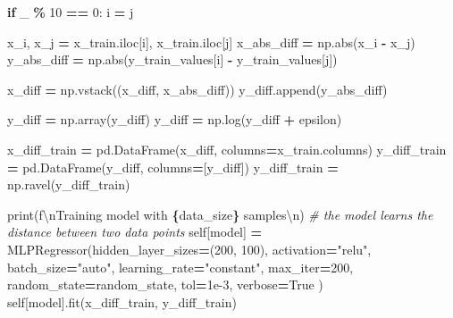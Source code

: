 \documentclass[
]{article}
\newenvironment{Shaded}{\begin{snugshade}}{\end{snugshade}}
\newcommand{\BuiltInTok}[1]{#1}
\newcommand{\CharTok}[1]{\textcolor[rgb]{0.31,0.60,0.02}{#1}}
\newcommand{\CommentTok}[1]{\textcolor[rgb]{0.56,0.35,0.01}{\textit{#1}}}
\newcommand{\ControlFlowTok}[1]{\textcolor[rgb]{0.13,0.29,0.53}{\textbf{#1}}}
\newcommand{\DecValTok}[1]{\textcolor[rgb]{0.00,0.00,0.81}{#1}}
\newcommand{\FloatTok}[1]{\textcolor[rgb]{0.00,0.00,0.81}{#1}}
\newcommand{\NormalTok}[1]{#1}
\newcommand{\OperatorTok}[1]{\textcolor[rgb]{0.81,0.36,0.00}{\textbf{#1}}}
\newcommand{\SpecialCharTok}[1]{\textcolor[rgb]{0.81,0.36,0.00}{\textbf{#1}}}
\newcommand{\SpecialStringTok}[1]{\textcolor[rgb]{0.31,0.60,0.02}{#1}}
\newcommand{\StringTok}[1]{\textcolor[rgb]{0.31,0.60,0.02}{#1}}
\newcommand{\VariableTok}[1]{\textcolor[rgb]{0.00,0.00,0.00}{#1}}
\begin{document}
\begin{Shaded}
\begin{Highlighting}[]
            \ControlFlowTok{if}\NormalTok{ \_ }\OperatorTok{\%} \DecValTok{10} \OperatorTok{==} \DecValTok{0}\NormalTok{:}
\NormalTok{                i }\OperatorTok{=}\NormalTok{ j}

\NormalTok{            x\_i, x\_j }\OperatorTok{=}\NormalTok{ x\_train.iloc[i], x\_train.iloc[j]}
\NormalTok{            x\_abs\_diff }\OperatorTok{=}\NormalTok{ np.}\BuiltInTok{abs}\NormalTok{(x\_i }\OperatorTok{{-}}\NormalTok{ x\_j)}
\NormalTok{            y\_abs\_diff }\OperatorTok{=}\NormalTok{ np.}\BuiltInTok{abs}\NormalTok{(y\_train\_values[i] }\OperatorTok{{-}}\NormalTok{ y\_train\_values[j])}

\NormalTok{            x\_diff }\OperatorTok{=}\NormalTok{ np.vstack((x\_diff, x\_abs\_diff))}
\NormalTok{            y\_diff.append(y\_abs\_diff)}

\NormalTok{        y\_diff }\OperatorTok{=}\NormalTok{ np.array(y\_diff)}
\NormalTok{        y\_diff }\OperatorTok{=}\NormalTok{ np.log(y\_diff }\OperatorTok{+}\NormalTok{ epsilon)}

\NormalTok{        x\_diff\_train }\OperatorTok{=}\NormalTok{ pd.DataFrame(x\_diff, columns}\OperatorTok{=}\NormalTok{x\_train.columns)}
\NormalTok{        y\_diff\_train }\OperatorTok{=}\NormalTok{ pd.DataFrame(y\_diff, columns}\OperatorTok{=}\NormalTok{[}\StringTok{\textquotesingle{}y\_diff\textquotesingle{}}\NormalTok{])}
\NormalTok{        y\_diff\_train }\OperatorTok{=}\NormalTok{ np.ravel(y\_diff\_train)}

        \BuiltInTok{print}\NormalTok{(}\SpecialStringTok{f\textquotesingle{}}\CharTok{\textbackslash{}n}\SpecialStringTok{Training model with }\SpecialCharTok{\{}\NormalTok{data\_size}\SpecialCharTok{\}}\SpecialStringTok{ samples}\CharTok{\textbackslash{}n}\SpecialStringTok{\textquotesingle{}}\NormalTok{)}
        \CommentTok{\# the model learns the distance between two data points}
        \VariableTok{self}\NormalTok{[}\StringTok{\textquotesingle{}model\textquotesingle{}}\NormalTok{] }\OperatorTok{=}\NormalTok{ MLPRegressor(hidden\_layer\_sizes}\OperatorTok{=}\NormalTok{(}\DecValTok{200}\NormalTok{, }\DecValTok{100}\NormalTok{),}
\NormalTok{                                     activation}\OperatorTok{=}\StringTok{"relu"}\NormalTok{,}
\NormalTok{                                     batch\_size}\OperatorTok{=}\StringTok{"auto"}\NormalTok{,}
\NormalTok{                                     learning\_rate}\OperatorTok{=}\StringTok{"constant"}\NormalTok{,}
\NormalTok{                                     max\_iter}\OperatorTok{=}\DecValTok{200}\NormalTok{,}
\NormalTok{                                     random\_state}\OperatorTok{=}\NormalTok{random\_state,}
\NormalTok{                                     tol}\OperatorTok{=}\FloatTok{1e{-}3}\NormalTok{,}
\NormalTok{                                     verbose}\OperatorTok{=}\VariableTok{True}
\NormalTok{                                     )}
        \VariableTok{self}\NormalTok{[}\StringTok{\textquotesingle{}model\textquotesingle{}}\NormalTok{].fit(x\_diff\_train, y\_diff\_train)}


\end{Highlighting}
\end{Shaded}
\end{document}
